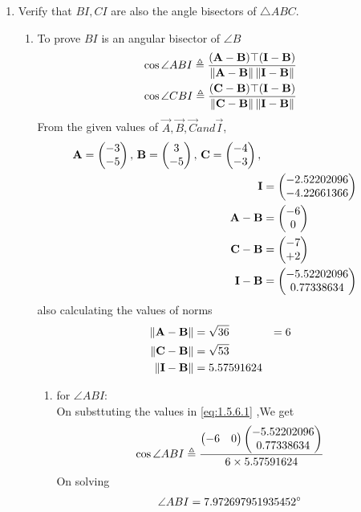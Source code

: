 \documentclass[11pt]{book}
\begin{document}
\begin{enumerate}[label=\thesection.\arabic*.,ref=\thesection.\theenumi]
\item Verify that $BI, CI$ are also the angle bisectors of $\triangle ABC$. \\
\solution
\begin{enumerate}
    \item To prove $BI$ is an angular bisector of $ \angle B$
\begin{align}
\label{eq:1.5.6.1}
\cos{\angle ABI} \triangleq \frac{(\vec{A}-\vec{B})\top(\vec{I}-\vec{B})}{\norm{\vec{A}-\vec{B}}\norm{\vec{I}-\vec{B}}} \\
\cos{\angle CBI} \triangleq \frac{(\vec{C}-\vec{B})\top(\vec{I}-\vec{B})}{\norm{\vec{C}-\vec{B}}\norm{\vec{I}-\vec{B}}} 
\end{align}
From the given values of $\vec{A},\vec{B},\vec{C} and \vec{I}$,\\
\begin{align}
    \mathbf{A}=\begin{pmatrix}-3 \\ -5\end{pmatrix},\,
\mathbf{B}=\begin{pmatrix}3\\-5\end{pmatrix},\,
	\mathbf{C}=\begin{pmatrix}-4\\-3\end{pmatrix},\, \\
 \mathbf{I} &= \begin{pmatrix}-2.52202096 \\ -4.22661366\end{pmatrix} \\
	\mathbf{A}-\mathbf{B} &=\begin{pmatrix}-6\\0\end{pmatrix} \\
	\mathbf{C}-\mathbf{B}&= \begin{pmatrix}-7\\+2\end{pmatrix} \\
 \mathbf{I}-\mathbf{B}  &=\begin{pmatrix}-5.52202096 \\ 0.77338634\end{pmatrix}
\end{align}
also calculating the values of norms
\begin{align}
	\left\lVert\mathbf{A}-\mathbf{B}\right\rVert &= \sqrt{36} &= 6\\
	\left\lVert\mathbf{C}-\mathbf{B}\right\rVert &= \sqrt{53} \\
 	\left\lVert\mathbf{I}-\mathbf{B}\right\rVert &= 5.57591624 \\
\end{align}


\begin{enumerate}
    \item for $\angle ABI$: \\
    On substtuting the values in  \eqref{eq:1.5.6.1} ,We get 
    \begin{align}
        \cos{\angle ABI} \triangleq \frac{\begin{pmatrix} -6 & 0\end{pmatrix}\begin{pmatrix}-5.52202096 \\ 0.77338634\end{pmatrix}}{ 6\times 5.57591624} \\
    \end{align}
    On solving 
    \begin{align}
        \angle ABI = 7.972697951935452 \degree
    \end{align}
    

\end{enumerate}
\end{enumerate}
\end{enumerate}
\end{document}
